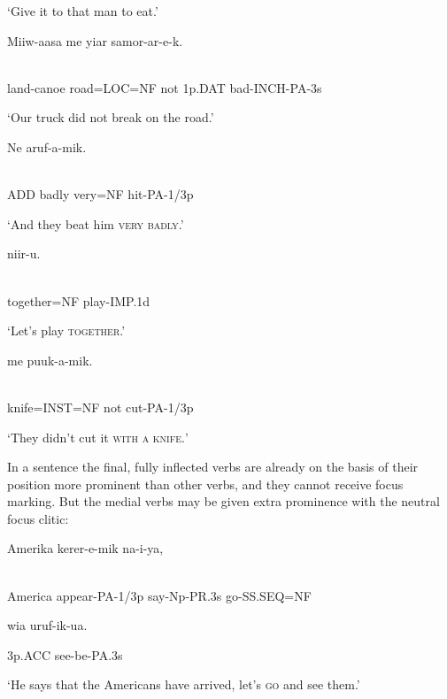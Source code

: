 `Give it to that man to eat.'

\ea%
\label{ex:x1724}
\gll Miiw-aasa    me  yiar  samor-ar-e-k. \\
      \\
\glt
\z

land-canoe  road=LOC=NF  not  1p.DAT  bad-INCH-PA-3s

`Our truck did not break on the road.'

\ea%
\label{ex:x1730}
\gll Ne    aruf-a-mik. \\
      \\
\glt
\z

ADD  badly  very=NF  hit-PA-1/3p

`And they beat him \textsc{very badly}.'

\ea%
\label{ex:x1725}
\gll {}  niir-u. \\
      \\
\glt
\z

together=NF  play-IMP.1d

`Let's play \textsc{together}.'

\ea%
\label{ex:x1726}
\gll {}  me  puuk-a-mik. \\
      \\
\glt
\z

knife=INST=NF  not  cut-PA-1/3p

`They didn't cut it \textsc{with a knife}\textsc{.}'

In a sentence the final, fully inflected verbs are already on the basis of their position more prominent than other verbs, and they cannot receive focus marking. But the medial verbs may be given extra prominence with the neutral focus clitic:

\ea%
\label{ex:x1727}
\gll Amerika  kerer-e-mik  na-i-ya,   \\
      \\
\glt
\z

America  appear-PA-1/3p  say-Np-PR.3s  go-SS.SEQ=NF

wia  uruf-ik-ua.

3p.ACC  see-be-PA.3s

`He says that the Americans have arrived, let's \textsc{go} and see them.'

